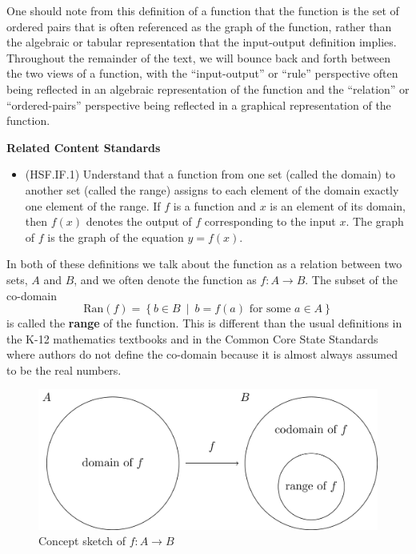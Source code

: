 \documentclass[
]{book}
\providecommand{\tightlist}{%
  \setlength{\itemsep}{0pt}\setlength{\parskip}{0pt}}
\newenvironment{standards}{}{}
\theoremstyle{definition}
\theoremstyle{definition}
\theoremstyle{definition}
\theoremstyle{definition}
\theoremstyle{remark}
\begin{document}
One should note from this definition of a function that the function is the set of ordered pairs that is often referenced as the graph of the function, rather than the algebraic or tabular representation that the input-output definition implies. Throughout the remainder of the text, we will bounce back and forth between the two views of a function, with the ``input-output'' or ``rule'' perspective often being reflected in an algebraic representation of the function and the ``relation'' or ``ordered-pairs'' perspective being reflected in a graphical representation of the function.

\begin{standards}

\begin{center}
\textbf{Related Content Standards}

\end{center}

\begin{itemize}
\tightlist
\item
  (HSF.IF.1) Understand that a function from one set (called the domain) to another set (called the range) assigns to each element of the domain exactly one element of the range. If \(f\) is a function and \(x\) is an element of its domain, then \(f(x)\) denotes the output of \(f\) corresponding to the input \(x\). The graph of \(f\) is the graph of the equation \(y = f(x)\).\\
\end{itemize}

\end{standards}

In both of these definitions we talk about the function as a relation between two sets, \(A\) and \(B\), and we often denote the function as \(f:A \rightarrow B\). The subset of the co-domain \[\mbox{Ran}(f)=\left\{b\in B \: \middle \vert  \: b=f(a) \mbox{ for some } a \in A\right\}\] is called the \textbf{range} of the function. This is different than the usual definitions in the K-12 mathematics textbooks and in the Common Core State Standards where authors do not define the co-domain because it is almost always assumed to be the real numbers.

\begin{figure}

{\centering \includegraphics[width=0.6\linewidth]{tikz/function-sets-concept} 

}

\caption{Concept sketch of $f:A \rightarrow B$}\label{fig:unnamed-chunk-54}
\end{figure}
\end{document}
